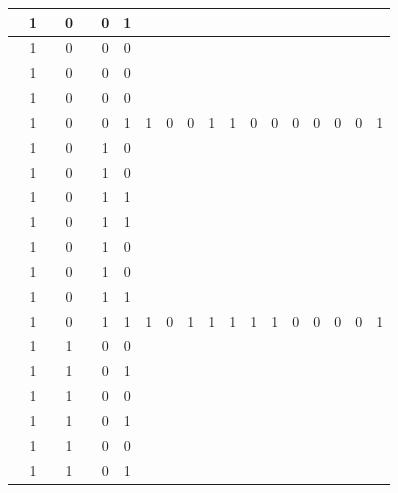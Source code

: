 \begin{table}[!tb]
\begin{tabular}{|c|c|c|c|c|c|c|c|c|c|c|c|c|c|c|c|c|c|c|}
        \rowcolor{yellow!40}  & 1 &  & 0 &  & 0 & 1 &  &  &  &  &  &  &  &  &  &  &  &  \\ \hline
        \rowcolor{yellow!40}  & 1 &  & 0 &  & 0 & 0 &  &  &  &  &  &  &  &  &  &  &  &  \\ \hline
        \rowcolor{yellow!40}  & 1 &  & 0 &  & 0 & 0 &  &  &  &  &  &  &  &  &  &  &  &  \\ \hline
        \rowcolor{yellow!40}  & 1 &  & 0 &  & 0 & 0 &  &  &  &  &  &  &  &  &  &  &  &  \\ \hline
        \rowcolor{yellow!40}  & 1 &  & 0 &  & 0 & 1 & 1 & 0 & 0 & 1 & 1 & 0 & 0 & 0 & 0 & 0 & 0 & 1 \\ \hline
        \rowcolor{gray!40}  & 1 &  & 0 &  & 1 & 0 &  &  &  &  &  &  &  &  &  &  &  &  \\ \hline
        \rowcolor{gray!40}  & 1 &  & 0 &  & 1 & 0 &  &  &  &  &  &  &  &  &  &  &  &  \\ \hline
        \rowcolor{gray!40}  & 1 &  & 0 &  & 1 & 1 &  &  &  &  &  &  &  &  &  &  &  &  \\ \hline
        \rowcolor{gray!40}  & 1 &  & 0 &  & 1 & 1 &  &  &  &  &  &  &  &  &  &  &  &  \\ \hline
        \rowcolor{gray!40}  & 1 &  & 0 &  & 1 & 0 &  &  &  &  &  &  &  &  &  &  &  &  \\ \hline
        \rowcolor{gray!40}  & 1 &  & 0 &  & 1 & 0 &  &  &  &  &  &  &  &  &  &  &  &  \\ \hline
        \rowcolor{gray!40}  & 1 &  & 0 &  & 1 & 1 &  &  &  &  &  &  &  &  &  &  &  &  \\ \hline
        \rowcolor{gray!40}  & 1 &  & 0 &  & 1 & 1 & 1 & 0 & 1 & 1 & 1 & 1 & 1 & 0 & 0 & 0 & 0 & 1 \\ \hline
        \rowcolor{blue!40}  & 1 &  & 1 &  & 0 & 0 &  &  &  &  &  &  &  &  &  &  &  &  \\ \hline
        \rowcolor{blue!40}  & 1 &  & 1 &  & 0 & 1 &  &  &  &  &  &  &  &  &  &  &  &  \\ \hline
        \rowcolor{blue!40}  & 1 &  & 1 &  & 0 & 0 &  &  &  &  &  &  &  &  &  &  &  &  \\ \hline
        \rowcolor{blue!40}  & 1 &  & 1 &  & 0 & 1 &  &  &  &  &  &  &  &  &  &  &  &  \\ \hline
        \rowcolor{blue!40}  & 1 &  & 1 &  & 0 & 0 &  &  &  &  &  &  &  &  &  &  &  &  \\ \hline
        \rowcolor{blue!40}  & 1 &  & 1 &  & 0 & 1 &  &  &  &  &  &  &  &  &  &  &  &  \\ \hline

\end{tabular}
\end{table}
